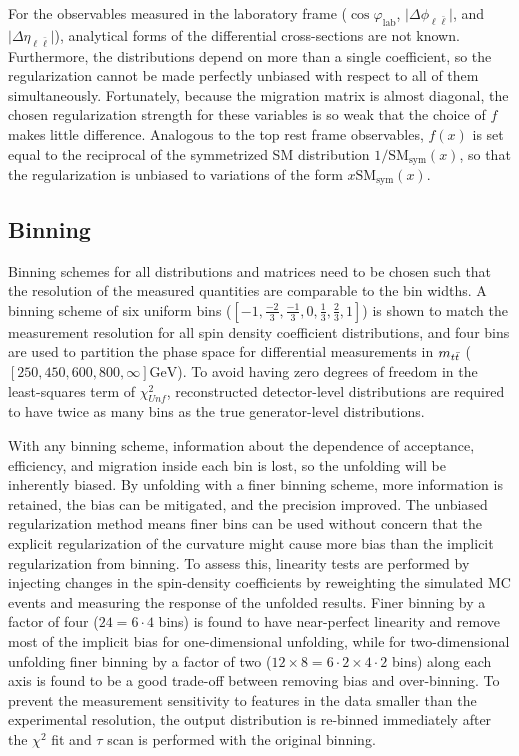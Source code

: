 For the observables measured in the laboratory frame ($\cos\varphi_{\mathrm{lab}}$, $\vert \Delta\phi_{\ell\bar{\ell}} \vert$, and $\vert \Delta\eta_{\ell\bar{\ell}} \vert$), analytical forms of the differential cross-sections are not known. 
Furthermore, the distributions depend on more than a single coefficient, so the regularization cannot be made perfectly unbiased with respect to all of them simultaneously. 
Fortunately, because the migration matrix is almost diagonal, the chosen regularization strength for these variables is so weak that the choice of $f$ makes little difference. 
Analogous to the top rest frame observables, $f(x)$ is set equal to the reciprocal of the symmetrized SM distribution $1/\mathrm{SM_{sym}}(x)$, so that the regularization is unbiased to variations of the form $x \mathrm{SM_{sym}}(x)$. 

\subsection{Binning}
\label{Binning}
Binning schemes for all distributions and matrices need to be chosen such that the resolution of the measured quantities are comparable to the bin widths.
A binning scheme of six uniform bins ($[-1,\frac{-2}{3},\frac{-1}{3},0,\frac{1}{3},\frac{2}{3},1]$) is shown to match the measurement resolution for all spin density coefficient distributions, and four bins are used to partition the phase space for differential measurements in $m_{t\bar{t}}$ ($[250,450,600,800,\infty] \si{\GeV}$).
To avoid having zero degrees of freedom in the least-squares term of $\chi^{2}_{Unf}$, reconstructed detector-level distributions are required to have twice as many bins as the true generator-level distributions.

With any binning scheme, information about the dependence of acceptance, efficiency, and migration inside each bin is lost, so the unfolding will be inherently biased.
By unfolding with a finer binning scheme, more information is retained, the bias can be mitigated, and the precision improved.
The unbiased regularization method means finer bins can be used without concern that the explicit regularization of the curvature might cause more bias than the implicit regularization from binning.
To assess this, linearity tests are performed by injecting changes in the spin-density coefficients by reweighting the simulated MC events and measuring the response of the unfolded results.
Finer binning by a factor of four ($24 = 6 \cdot 4$ bins) is found to have near-perfect linearity and remove most of the implicit bias for one-dimensional unfolding, while for two-dimensional unfolding finer binning by a factor of two ($12 \times 8 = 6 \cdot 2 \times 4 \cdot 2$ bins) along each axis is found to be a good trade-off between removing bias and over-binning.
To prevent the measurement sensitivity to features in the data smaller than the experimental resolution, the output distribution is re-binned immediately after the $\chi^2$ fit and $\tau$ scan is performed with the original binning.











